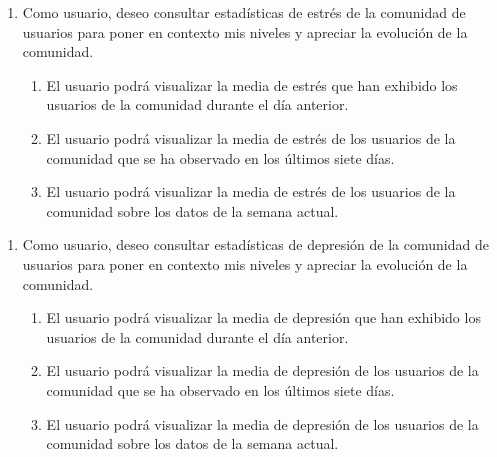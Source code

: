         \begin{enumerate}[resume=req-usuario,label=\textbf{\texttt{RU-\arabic*}}]
            \item \label{req:usuario:comunidad_estres} Como usuario, deseo consultar estadísticas de estrés de la comunidad de usuarios para poner en contexto mis niveles y apreciar la evolución de la comunidad.
            \begin{enumerate}[resume=req-funcionales,label=\textbf{\texttt{RF-\arabic*}}]
                \item \label{req:funcionales:comunidad_estres_dia_anterior_ver} El usuario podrá visualizar la media de estrés que han exhibido los usuarios de la comunidad durante el día anterior.
                \item \label{req:funcionales:comunidad_estres_siete_dias_ver} El usuario podrá visualizar la media de estrés de los usuarios de la comunidad que se ha observado en los últimos siete días.
                \item \label{req:funcionales:comunidad_estres_semana_actual_ver} El usuario podrá visualizar la media de estrés de los usuarios de la comunidad sobre los datos de la semana actual.
            \end{enumerate}
        \end{enumerate}
        \begin{enumerate}[resume=req-usuario,label=\textbf{\texttt{RU-\arabic*}}]
            \item \label{req:usuario:comunidad_depresion} Como usuario, deseo consultar estadísticas de depresión de la comunidad de usuarios para poner en contexto mis niveles y apreciar la evolución de la comunidad.
            \begin{enumerate}[resume=req-funcionales,label=\textbf{\texttt{RF-\arabic*}}]
                \item \label{req:funcionales:comunidad_depresion_dia_anterior_ver} El usuario podrá visualizar la media de depresión que han exhibido los usuarios de la comunidad durante el día anterior.
                \item \label{req:funcionales:comunidad_depresion_siete_dias_ver} El usuario podrá visualizar la media de depresión de los usuarios de la comunidad que se ha observado en los últimos siete días.
                \item \label{req:funcionales:comunidad_depresion_semana_actual_ver} El usuario podrá visualizar la media de depresión de los usuarios de la comunidad sobre los datos de la semana actual.
            \end{enumerate}
        \end{enumerate}
